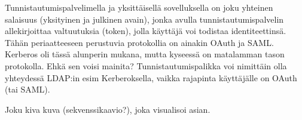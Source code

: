 Tunnistautumispalvelimella ja yksittäisellä sovelluksella on joku yhteinen salaisuus (yksityinen ja julkinen avain), jonka avulla tunnistautumispalvelin allekirjoittaa valtuutuksia (token), jolla käyttäjä voi todistaa identiteettinsä. Tähän periaatteeseen perustuvia protokollia on ainakin OAuth ja SAML. Kerberos oli tässä alunperin mukana, mutta kyseessä on matalamman tason protokolla. Ehkä sen voisi mainita? Tunnistautumispalikka voi nimittäin olla yhteydessä LDAP:in esim Kerberoksella, vaikka rajapinta käyttäjälle on OAuth (tai SAML).

Joku kiva kuva (sekvenssikaavio?), joka visualisoi asian.
